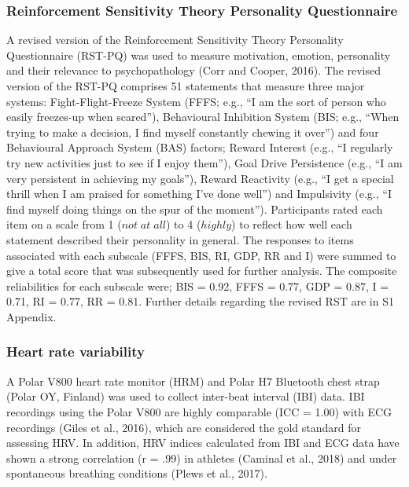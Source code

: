 \documentclass[utf8]{frontiersHLTH}
\begin{document}
\hypertarget{reinforcement-sensitivity-theory-personality-questionnaire}{%
\subsubsection*{Reinforcement Sensitivity Theory Personality
Questionnaire}\label{reinforcement-sensitivity-theory-personality-questionnaire}}

A revised version of the Reinforcement Sensitivity Theory Personality
Questionnaire (RST-PQ) was used to measure motivation, emotion,
personality and their relevance to psychopathology (Corr and Cooper,
2016). The revised version of the RST-PQ comprises 51 statements that
measure three major systems: Fight-Flight-Freeze System (FFFS; e.g., ``I
am the sort of person who easily freezes-up when scared''), Behavioural
Inhibition System (BIS; e.g., ``When trying to make a decision, I find
myself constantly chewing it over'') and four Behavioural Approach
System (BAS) factors; Reward Interest (e.g., ``I regularly try new
activities just to see if I enjoy them''), Goal Drive Persistence (e.g.,
``I am very persistent in achieving my goals''), Reward Reactivity
(e.g., ``I get a special thrill when I am praised for something I've
done well'') and Impulsivity (e.g., ``I find myself doing things on the
spur of the moment''). Participants rated each item on a scale from 1
(\(not\; at\; all\)) to 4 (\(highly\)) to reflect how well each
statement described their personality in general. The responses to items
associated with each subscale (FFFS, BIS, RI, GDP, RR and I) were summed
to give a total score that was subsequently used for further analysis.
The composite reliabilities for each subscale were; BIS = 0.92, FFFS =
0.77, GDP = 0.87, I = 0.71, RI = 0.77, RR = 0.81. Further details
regarding the revised RST are in S1 Appendix.

\hypertarget{heart-rate-variability}{%
\subsubsection*{Heart rate variability}\label{heart-rate-variability}}

A Polar V800 heart rate monitor (HRM) and Polar H7 Bluetooth chest strap
(Polar OY, Finland) was used to collect inter-beat interval (IBI) data.
IBI recordings using the Polar V800 are highly comparable (ICC = 1.00)
with ECG recordings (Giles et al., 2016), which are considered the gold
standard for assessing HRV. In addition, HRV indices calculated from IBI
and ECG data have shown a strong correlation (r = .99) in athletes
(Caminal et al., 2018) and under spontaneous breathing conditions (Plews
et al., 2017).
\end{document}
